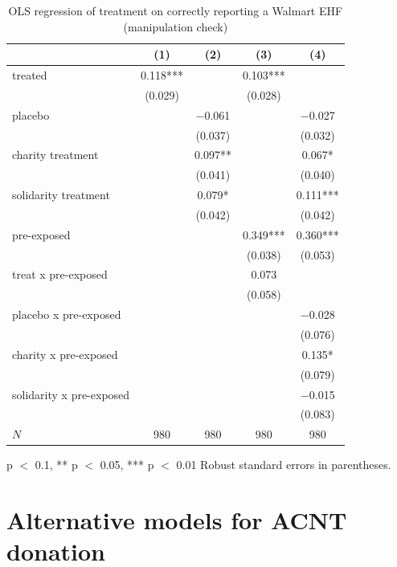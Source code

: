 \documentclass[
  11pt,
  oneside]{article}
\begin{document}
\begin{table}[H]
\centering\centering
\caption{\label{tab:setup}OLS regression of treatment on correctly reporting a Walmart EHF (manipulation check) \label{tab:tab-manip-check}}
\centering
\begin{threeparttable}
\begin{tabular}[t]{lcccc}
\toprule
  & (1) & (2) & (3) & (4)\\
\midrule
treated & \num{0.118}*** &  & \num{0.103}*** & \\
 & (\num{0.029}) &  & (\num{0.028}) & \\
placebo &  & \num{-0.061} &  & \num{-0.027}\\
 &  & (\num{0.037}) &  & (\num{0.032})\\
charity treatment &  & \num{0.097}** &  & \num{0.067}*\\
 &  & (\num{0.041}) &  & (\num{0.040})\\
solidarity treatment &  & \num{0.079}* &  & \num{0.111}***\\
 &  & (\num{0.042}) &  & (\num{0.042})\\
pre-exposed &  &  & \num{0.349}*** & \num{0.360}***\\
 &  &  & (\num{0.038}) & (\num{0.053})\\
treat x pre-exposed &  &  & \num{0.073} & \\
 &  &  & (\num{0.058}) & \\
placebo x pre-exposed &  &  &  & \num{-0.028}\\
 &  &  &  & (\num{0.076})\\
charity x pre-exposed &  &  &  & \num{0.135}*\\
 &  &  &  & (\num{0.079})\\
solidarity x pre-exposed &  &  &  & \num{-0.015}\\
 &  &  &  & (\num{0.083})\\
\midrule
$N$ & \num{980} & \num{980} & \num{980} & \num{980}\\
\bottomrule
\end{tabular}
\begin{tablenotes}
\item * p $<$ 0.1, ** p $<$ 0.05, *** p $<$ 0.01 Robust standard errors in parentheses.
\end{tablenotes}
\end{threeparttable}
\end{table}

\newpage

\section{Alternative models for ACNT donation}\label{app-wmt-altdonate}
\end{document}
